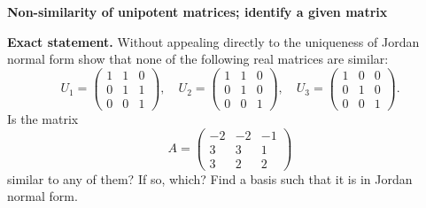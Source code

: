 \begin{problem}[CP-I-0065]
\label{prob:cp-i-0065}
\textbf{Non-similarity of unipotent matrices; identify a given matrix}

\textbf{Exact statement.}
\hspace*{1.5em}Without appealing directly to the uniqueness of Jordan normal form show that none of the following real matrices are similar:
\[
U_1=\begin{pmatrix}1&1&0\\0&1&1\\0&0&1\end{pmatrix},\quad
U_2=\begin{pmatrix}1&1&0\\0&1&0\\0&0&1\end{pmatrix},\quad
U_3=\begin{pmatrix}1&0&0\\0&1&0\\0&0&1\end{pmatrix}.
\]
Is the matrix
\[
A=\begin{pmatrix}-2&-2&-1\\ 3&3&1\\ 3&2&2\end{pmatrix}
\]
similar to any of them? If so, which? Find a basis such that it is in Jordan normal form.

\end{problem}

